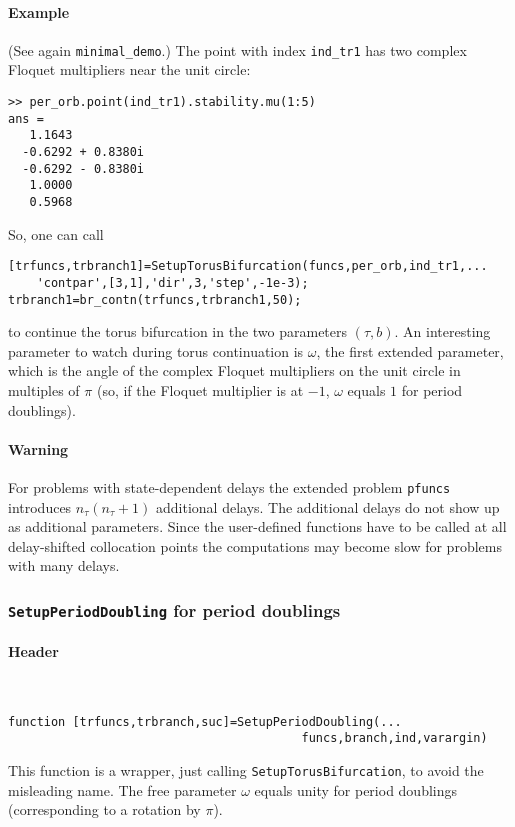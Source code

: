 \documentclass[11pt]{scrartcl}
\newcommand{\mlvar}[1]{\lstinline[keywordstyle=\color{var}]!#1!}
\newcommand{\blist}[1]{\mbox{\lstinline!#1!}}  \newlength{\tabw}
\begin{document}
\paragraph{Example}
(See again \texttt{minimal\_demo}.) The point with index
\blist{ind_tr1} has two complex Floquet multipliers near the unit
circle: {\small
\begin{verbatim}
>> per_orb.point(ind_tr1).stability.mu(1:5)
ans =
   1.1643          
  -0.6292 + 0.8380i
  -0.6292 - 0.8380i
   1.0000          
   0.5968          
\end{verbatim}
} So, one can call
\begin{lstlisting}
[trfuncs,trbranch1]=SetupTorusBifurcation(funcs,per_orb,ind_tr1,...
    'contpar',[3,1],'dir',3,'step',-1e-3);
trbranch1=br_contn(trfuncs,trbranch1,50);
\end{lstlisting}
to continue the torus bifurcation in the two parameters $(\tau,b)$. An
interesting parameter to watch during torus continuation is $\omega$,
the first extended parameter, which is the angle of the complex
Floquet multipliers on the unit circle in multiples of $\pi$ (so, if
the Floquet multiplier is at $-1$, $\omega$ equals $1$ for period doublings).

\paragraph{Warning}
For problems with state-dependent delays the extended problem
\mlvar{pfuncs} introduces $n_\tau(n_\tau+1)$ additional delays. The
additional delays do not show up as additional parameters.  Since the
user-defined functions have to be called at all delay-shifted
collocation points the computations may become slow for problems with
many delays.

\subsubsection{\blist{SetupPeriodDoubling} for period doublings}
\label{sec:pd}
\paragraph{Header}\ 
\begin{lstlisting}
function [trfuncs,trbranch,suc]=SetupPeriodDoubling(...
                                         funcs,branch,ind,varargin)
\end{lstlisting}
This function is a wrapper, just calling
\blist{SetupTorusBifurcation}, to avoid the misleading name. The free
parameter $\omega$ equals unity for period doublings (corresponding to
a rotation by $\pi$).
\end{document}
